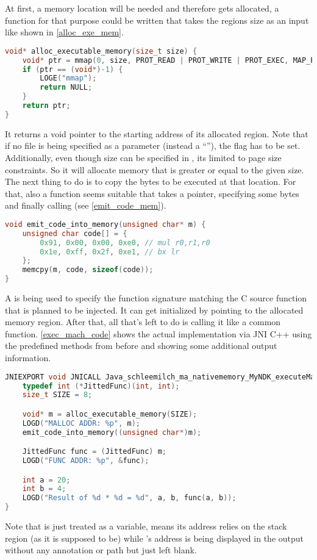 At first, a memory location will be needed and therefore gets allocated,
a function for that purpose could be written that takes the regions size as an input like shown in \autoref{alloc_exe_mem}.
\begin{lstlisting}[language=C++, caption=alloc\_executable\_memory(), label=alloc_exe_mem]
void* alloc_executable_memory(size_t size) {
    void* ptr = mmap(0, size, PROT_READ | PROT_WRITE | PROT_EXEC, MAP_PRIVATE | MAP_ANONYMOUS, -1, 0);
    if (ptr == (void*)-1) {
        LOGE("mmap");
        return NULL;
    }
    return ptr;
}
\end{lstlisting}
It returns a void pointer to the starting address of its allocated region. Note that 
if no file is being specified as a  parameter (instead a ``''),
the  flag has to be set. Additionally, even though size can be specified in , its limited to page size constraints. So it will allocate 
memory that is greater or equal to the given size. 
The next thing to do is to copy the bytes to be executed at that location. For that,
also a function seems suitable that takes a pointer, specifying some bytes and finally calling  (see \autoref{emit_code_mem}).  
\begin{lstlisting}[language=C++, caption=emit\_code\_into\_memory(), label=emit_code_mem]
void emit_code_into_memory(unsigned char* m) {
    unsigned char code[] = {
        0x91, 0x00, 0x00, 0xe0, // mul r0,r1,r0
        0x1e, 0xff, 0x2f, 0xe1, // bx lr
    };
    memcpy(m, code, sizeof(code));
}
\end{lstlisting}
A  is being used to specify the function signature matching the C source function that is planned to be injected.
It can get initialized by pointing to the allocated memory region. 
After that, all that's left to do is calling it like a common function.
\autoref{exec_mach_code} shows the actual implementation via JNI C++ using the predefined methods from before and showing some additional output information.
\begin{lstlisting}[language=C++, caption=executeMachineCode(), label=exec_mach_code]
JNIEXPORT void JNICALL Java_schleemilch_ma_nativememory_MyNDK_executeMachineCode (JNIEnv *env, jobject obj){
    typedef int (*JittedFunc)(int, int);
    size_t SIZE = 8;

    void* m = alloc_executable_memory(SIZE);
    LOGD("MALLOC ADDR: %p", m);
    emit_code_into_memory((unsigned char*)m);

    JittedFunc func = (JittedFunc) m;
    LOGD("FUNC ADDR: %p", &func);

    int a = 20;
    int b = 4;
    LOGD("Result of %d * %d = %d", a, b, func(a, b));
}
\end{lstlisting}
Note that  is just treated as a variable, means its address relies on the stack region (as it is supposed to be) while 's address is being displayed in the  output without any  annotation or path
but just left blank.

